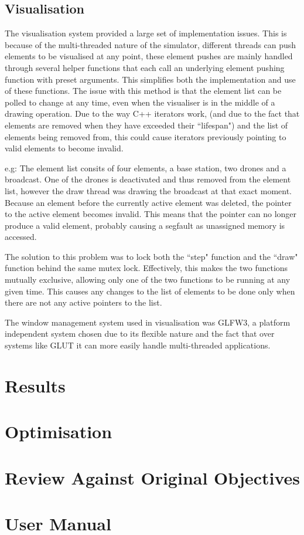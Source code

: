 	\subsection{Visualisation}
		The visualisation system provided a large set of implementation issues. This is because of the multi-threaded nature
		of the simulator, different threads can push elements to be visualised at any point, these element pushes are mainly
		handled through several helper functions that each call an underlying element pushing function with preset arguments.
		This simplifies both the implementation and use of these functions. The issue with this method is that the element list
		can be polled to change at any time, even when the visualiser is in the middle of a drawing operation. Due to the way
		C++ iterators work, (and due to the fact that elements are removed when they have exceeded their ``lifespan") and the
		list of elements being removed from, this could cause iterators previously pointing to valid elements to become invalid.

		e.g: The element list consits of four elements, a base station, two drones and a broadcast. One of the drones is
		deactivated and thus removed from the element list, however the draw thread was drawing the broadcast at that exact
		moment. Because an element before the currently active element was deleted, the pointer to the active element becomes
		invalid. This means that the pointer can no longer produce a valid element, probably causing a segfault as unassigned
		memory is accessed.

		The solution to this problem was to lock both the ``step" function and the ``draw" function behind the same mutex lock.
		Effectively, this makes the two functions mutually exclusive, allowing only one of the two functions to be running at any
		given time. This causes any changes to the list of elements to be done only when there are not any active pointers to the
		list.

		The window management system used in visualisation was GLFW3, a platform independent system chosen due to its flexible
		nature and the fact that over systems like GLUT it can more easily handle multi-threaded applications.

\section{Results}
\section{Optimisation}
\section{Review Against Original Objectives}
\section{User Manual}
